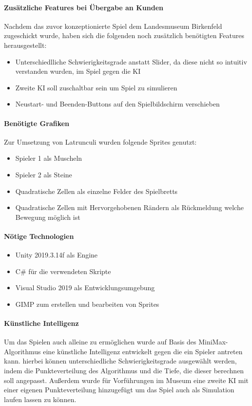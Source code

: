 \paragraph{Zusätzliche Features bei Übergabe an Kunden}
Nachdem das zuvor konzeptionierte Spiel dem Landesmuseum Birkenfeld zugeschickt wurde, haben sich die folgenden noch zusätzlich benötigten Features herausgestellt:
\begin{itemize}
	\item Unterschiedlliche Schwierigkeitsgrade anstatt Slider, da diese nicht so intuitiv verstanden wurden, im Spiel gegen die KI
	\item Zweite KI soll zuschaltbar sein um Spiel zu simulieren
	\item Neustart- und Beenden-Buttons auf den Spielbildschirm verschieben	
\end{itemize}


\paragraph{Benötigte Grafiken}
Zur Umsetzung von Latrunculi wurden folgende Sprites genutzt:
\begin{itemize}
	\item Spieler 1 als Muscheln
	\item Spieler 2 als Steine
	\item Quadratische Zellen als einzelne Felder des Spielbretts
	\item Quadratische Zellen mit Hervorgehobenen Rändern als Rückmeldung welche Bewegung möglich ist
\end{itemize}

\paragraph{Nötige Technologien}
\begin{itemize}
	\item Unity 2019.3.14f als Engine
	\item C\# für die verwendeten Skripte
	\item Visual Studio 2019 als Entwicklungsumgebung 
	\item GIMP zum erstellen und bearbeiten von Sprites
\end{itemize}

\paragraph{Künstliche Intelligenz}
Um das Spielen auch alleine zu ermöglichen wurde auf Basis des MiniMax-Algorithmus eine künstliche Intelligenz entwickelt gegen die ein Spieler antreten kann. hierbei können unterschiedliche Schwierigkeitsgrade ausgewählt werden, indem die Punkteverteilung des Algorithmus und die Tiefe, die dieser berechnen soll angepasst. Außerdem wurde für Vorführungen im Museum eine zweite KI mit einer eigenen Punkteverteilung hinzugefügt um das Spiel auch als Simulation laufen lassen zu können.

